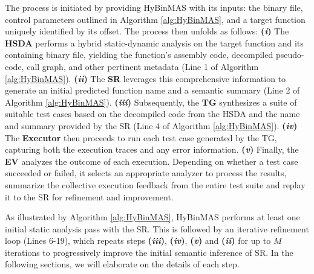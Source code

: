 \documentclass[acmsmall,screen,review,anonymous]{acmart} %
\begin{document}
The process is initiated by providing HyBinMAS with its inputs: the binary file, control parameters outlined in Algorithm \ref{alg:HyBinMAS}, and a target function uniquely identified by its offset. The process then unfolds as follows: \textbf{(\textit{i})} The \textbf{HSDA} performs a hybrid static-dynamic analysis on the target function and its containing binary file, yielding the function's assembly code, decompiled pseudo-code, call graph, and other pertinent metadata (Line 1 of Algorithm \ref{alg:HyBinMAS}). \textbf{(\textit{ii})} The \textbf{SR} leverages this comprehensive information to generate an initial predicted function name and a semantic summary (Line 2 of Algorithm \ref{alg:HyBinMAS}). \textbf{(\textit{iii})} Subsequently, the \textbf{TG} synthesizes a suite of suitable test cases based on the decompiled code from the HSDA and the name and summary provided by the SR (Line 4 of Algorithm \ref{alg:HyBinMAS}). \textbf{(\textit{iv})} The \textbf{Executor} then proceeds to run each test case generated by the TG, capturing both the execution traces and any error information. \textbf{(\textit{v})} Finally, the \textbf{EV} analyzes the outcome of each execution. Depending on whether a test case succeeded or failed, it selects an appropriate analyzer to process the results, summarize the collective execution feedback from the entire test suite and replay it to the SR for refinement and improvement.

As illustrated by Algorithm \ref{alg:HyBinMAS}, HyBinMAS performs at least one initial static analysis pass with the SR. This is followed by an iterative refinement loop (Lines 6-19), which repeats steps \textbf{(\textit{iii})}, \textbf{(\textit{iv})}, \textbf{(\textit{v})} and \textbf{(\textit{ii})} for up to $M$ iterations to progressively improve the initial semantic inference of SR. In the following sections, we will elaborate on the details of each step.


\end{document}
